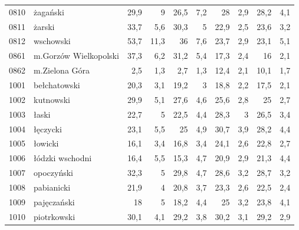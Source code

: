 \begin{center}
\begin{longtable}{lp{3cm}rrrrrrrr}
0810 & żagański                & 29,9    & 9           & 26,5     & 7,2          & 28       & 2,9          & 28,2     & 4,1          \\
0811 & żarski                  & 33,7    & 5,6         & 30,3     & 5            & 22,9     & 2,5          & 23,6     & 3,2          \\
0812 & wschowski               & 53,7    & 11,3        & 36       & 7,6          & 23,7     & 2,9          & 23,1     & 5,1          \\
0861 & m.Gorzów Wielkopolski   & 37,3    & 6,2         & 31,2     & 5,4          & 17,3     & 2,4          & 16       & 2,1          \\
0862 & m.Zielona Góra          & 2,5     & 1,3         & 2,7      & 1,3          & 12,4     & 2,1          & 10,1     & 1,7          \\
1001 & bełchatowski            & 20,3    & 3,1         & 19,2     & 3            & 18,8     & 2,2          & 17,5     & 2,1          \\
1002 & kutnowski               & 29,9    & 5,1         & 27,6     & 4,6          & 25,6     & 2,8          & 25       & 2,7          \\
1003 & łaski                   & 22,7    & 5           & 22,5     & 4,4          & 28,3     & 3            & 26,5     & 3,4          \\
1004 & łęczycki                & 23,1    & 5,5         & 25       & 4,9          & 30,7     & 3,9          & 28,2     & 4,4          \\
1005 & łowicki                 & 16,1    & 3,4         & 16,8     & 3,4          & 24,1     & 2,6          & 22,8     & 2,7          \\
1006 & łódzki wschodni         & 16,4    & 5,5         & 15,3     & 4,7          & 20,9     & 2,9          & 21,3     & 4,4          \\
1007 & opoczyński              & 32,3    & 5           & 29,8     & 4,7          & 28,6     & 3,2          & 28,7     & 3,2          \\
1008 & pabianicki              & 21,9    & 4           & 20,8     & 3,7          & 23,3     & 2,6          & 22,5     & 2,4          \\
1009 & pajęczański             & 18      & 5           & 18,2     & 4,4          & 25       & 3,2          & 23,8     & 4,1          \\
1010 & piotrkowski             & 30,1    & 4,1         & 29,2     & 3,8          & 30,2     & 3,1          & 29,2     & 2,9          \\

\end{longtable}
\end{center}
